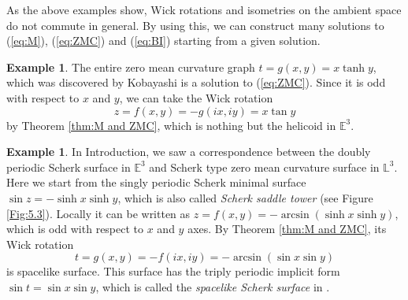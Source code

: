 \documentclass[12pt,amstex]{amsart}%
\theoremstyle{plain} %
\theoremstyle{definition}
\newtheorem{example}[theorem]{Example}
\begin{document}
As the above examples show, Wick rotations and isometries on the ambient space do not commute in general. By using this, we can construct many solutions to (\ref{eq:M}), (\ref{eq:ZMC}) and (\ref{eq:BI}) starting from a given solution.
\begin{example}\label{Ex:5.2}
The entire zero mean curvature graph $t=g(x,y)=x\tanh{y}$, which was discovered by Kobayashi \cite{Kobayashi} is a solution to (\ref{eq:ZMC}). Since it is odd with respect to $x$ and $y$, we can take the Wick rotation
\[
z=f(x,y)=-g(ix,iy)=x\tan{y}
\]
by Theorem \ref{thm:M and ZMC}, which is nothing but the helicoid in $\mathbb{E}^3$.
\end{example}


\begin{example}\label{Ex:5.3}
In Introduction, we saw a correspondence between the doubly periodic Scherk surface in $\mathbb{E}^3$ and Scherk type zero mean curvature surface in $\mathbb{L}^3$. Here we start from the singly periodic Scherk minimal surface $\sin{z}=-\sinh{x}\sinh{y}$, which is also called {\it Scherk saddle tower} (see Figure \ref{Fig:5.3}). Locally it can be written as $z=f(x,y)=-\arcsin{(\sinh{x}\sinh{y})}$, which is odd with respect to $x$ and $y$ axes. By Theorem \ref{thm:M and ZMC}, its Wick rotation
\[
t=g(x,y)=-f(ix,iy)=-\arcsin{(\sin{x}\sin{y})}
\]
is spacelike surface. This surface has the triply periodic implicit form $\sin{t}=\sin{x}\sin{y}$, which is called the {\it spacelike Scherk surface} in \cite[Example 3]{FujimoriETAL1}.



\end{example}
\end{document}
